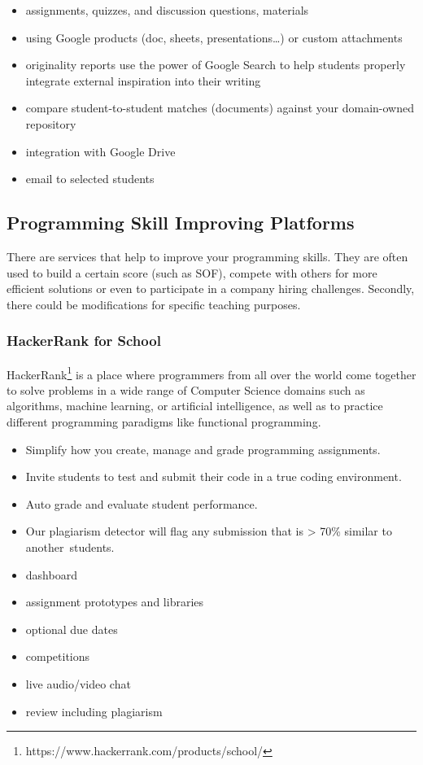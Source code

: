 \begin{itemize}
\item
  {assignments, quizzes, and discussion questions, materials}
\item
  {using Google products (doc, sheets, presentations\ldots{}) or custom attachments}
\item
  {originality reports use the power of Google Search to help students properly integrate external inspiration into their writing}
\item
  {compare student-to-student matches (documents) against your domain-owned repository}
\item
  {integration with Google Drive}
\item
  {email to selected students}
\end{itemize}

\subsection{Programming Skill Improving Platforms} \label{ssec:psip}

{There are services that help to improve your programming skills. They are often used to build a certain score (such as SOF), compete with others for more efficient solutions or even to participate in a company hiring challenges. Secondly, there could be modifications for specific teaching purposes.}

\subsubsection{HackerRank for School}

{HackerRank\footnote{https://www.hackerrank.com/products/school/} is a place where programmers from all over the world come together to solve problems in a wide range of Computer Science domains such as algorithms, machine learning, or artificial intelligence, as well as to practice different programming paradigms like functional programming.}

\begin{itemize}
\item
  {Simplify how you create, manage and grade programming assignments.}
\item
  {Invite students to test and submit their code in a true coding environment.}
\item
  {Auto grade and evaluate student performance.}
\item
  {Our plagiarism detector will flag any submission that is \textgreater{} 70\% similar to }{another}{~students.}
\item
  {dashboard}
\item
  {assignment prototypes and libraries}
\item
  {optional due dates}
\item
  {competitions}
\item
  {live audio/video chat}
\item
  {review including plagiarism}
\end{itemize}

